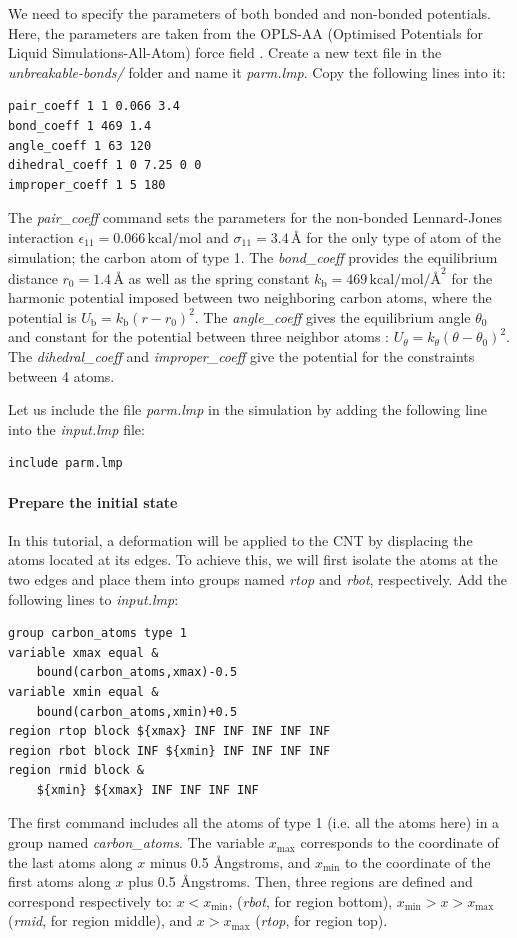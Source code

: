 \documentclass[9pt,tutorial]{livecoms}
\begin{document}
We need to specify the parameters of both bonded and non-bonded potentials.
Here, the parameters are taken from the OPLS-AA (Optimised Potentials for
Liquid Simulations-All-Atom) force field \cite{jorgensenDevelopmentTestingOPLS1996}.
Create a new text file in the \textit{unbreakable-bonds/} folder and name
it \textit{parm.lmp}. Copy the following lines into it:
{\normalsize \begin{verbatim}
pair_coeff 1 1 0.066 3.4
bond_coeff 1 469 1.4
angle_coeff 1 63 120
dihedral_coeff 1 0 7.25 0 0
improper_coeff 1 5 180
\end{verbatim}}
The \textit{pair\_coeff} command sets the parameters for the non-bonded
Lennard-Jones interaction $\epsilon_{11} = 0.066 \, \text{kcal/mol}$ and
$\sigma_{11} = 3.4 \, \text{\AA{}}$ for the only type of atom of the simulation;
the carbon atom of type 1.  The \textit{bond\_coeff} provides the equilibrium
distance $r_0= 1.4 \, \text{\AA{}}$ as well as the spring constant
$k_\text{b} = 469 \, \text{kcal/mol/\AA{}}^2$ for the harmonic potential imposed
between two neighboring carbon atoms, where the potential is
$U_\text{b} = k_\text{b} ( r - r_0)^2$. The
\textit{angle\_coeff} gives the equilibrium angle $\theta_0$ and constant for
the potential between three neighbor atoms :
$U_\theta = k_\theta ( \theta - \theta_0)^2$. The \textit{dihedral\_coeff}
and \textit{improper\_coeff} give the potential for the constraints between 4
atoms.

Let us include the file \textit{parm.lmp} in the simulation by adding
the following line into the \textit{input.lmp} file:
{\normalsize \begin{verbatim}
include parm.lmp
\end{verbatim}}

\paragraph{Prepare the initial state}

In this tutorial, a deformation will be applied to the CNT by displacing
the atoms located at its edges. To achieve this, we will first isolate the
atoms at the two edges and place them into groups named \textit{rtop} and
\textit{rbot}, respectively. Add the following lines to \textit{input.lmp}:
{\normalsize \begin{verbatim}
group carbon_atoms type 1
variable xmax equal &
    bound(carbon_atoms,xmax)-0.5
variable xmin equal &
    bound(carbon_atoms,xmin)+0.5
region rtop block ${xmax} INF INF INF INF INF
region rbot block INF ${xmin} INF INF INF INF
region rmid block &
    ${xmin} ${xmax} INF INF INF INF
\end{verbatim}}
The first command includes all the atoms of type 1 (i.e. all the atoms here)
in a group named \textit{carbon\_atoms}.
The variable $x_\text{max}$ corresponds to the coordinate of the
last atoms along $x$ minus 0.5 Ångstroms, and $x_\text{min}$ to the coordinate
of the first atoms along $x$ plus 0.5 Ångstroms. Then, three regions are defined
and correspond respectively to: $x < x_\text{min}$, (\textit{rbot}, for region
bottom), $x_\text{min} > x > x_\text{max}$ (\textit{rmid}, for region middle),
and $x > x_\text{max}$ (\textit{rtop}, for region top).
\end{document}

